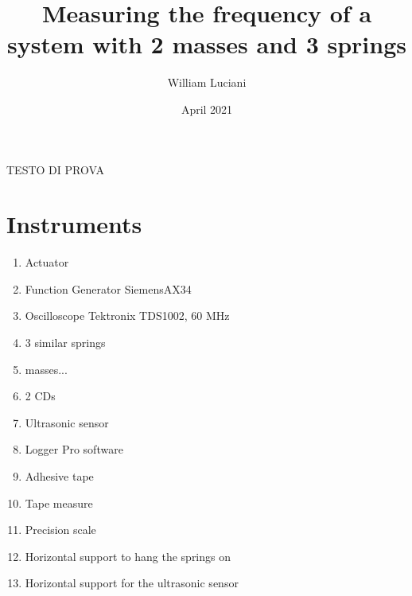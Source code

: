 \documentclass{article}
\title{ Measuring the frequency  of a system with 2 masses and 3 springs}
\author{William Luciani}
\date{April 2021}
\begin{document}
\maketitle

\begin{abstract}
\end{abstract}
TESTO DI PROVA
\section{Instruments} \label{sec:instr}
\begin{enumerate}
    \item Actuator
    \item Function Generator SiemensAX34
    \item Oscilloscope Tektronix TDS1002, 60 MHz
    \item 3 similar springs
    \item masses...
    \item 2 CDs
    \item Ultrasonic sensor
    \item Logger Pro software
    \item Adhesive tape
    \item Tape measure
    \item Precision scale
    \item Horizontal support to hang the springs on
    \item Horizontal support for the ultrasonic
          sensor
\end{enumerate}
\end{document}
